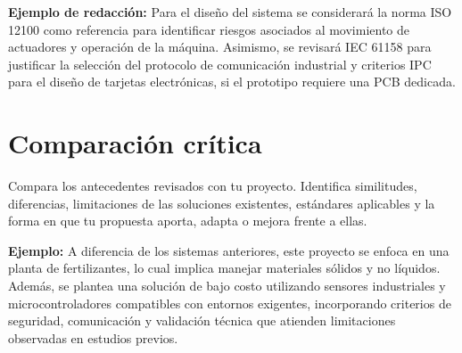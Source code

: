 \documentclass[12pt,letterpaper]{report}
\begin{document}
\begin{instrucciones}
\noindent \textbf{Ejemplo de redacción:} Para el diseño del sistema se considerará la norma ISO 12100 como referencia para identificar riesgos asociados al movimiento de actuadores y operación de la máquina. Asimismo, se revisará IEC 61158 para justificar la selección del protocolo de comunicación industrial y criterios IPC para el diseño de tarjetas electrónicas, si el prototipo requiere una PCB dedicada.
\end{instrucciones}

\section{Comparación crítica}
\begin{instrucciones}
Compara los antecedentes revisados con tu proyecto. Identifica similitudes, diferencias, limitaciones de las soluciones existentes, estándares aplicables y la forma en que tu propuesta aporta, adapta o mejora frente a ellas.

\vspace{2mm}
\noindent \textbf{Ejemplo:} A diferencia de los sistemas anteriores, este proyecto se enfoca en una planta de fertilizantes, lo cual implica manejar materiales sólidos y no líquidos. Además, se plantea una solución de bajo costo utilizando sensores industriales y microcontroladores compatibles con entornos exigentes, incorporando criterios de seguridad, comunicación y validación técnica que atienden limitaciones observadas en estudios previos.
\end{instrucciones}
\end{document}
